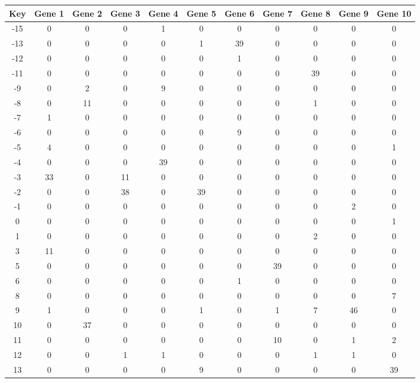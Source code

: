 \begin{tabular}{|c|c|c|c|c|c|c|c|c|c|c|}
\hline
Key & Gene 1 & Gene 2 & Gene 3 & Gene 4 & Gene 5 & Gene 6 & Gene 7 & Gene 8 & Gene 9 & Gene 10 \\
\hline
-15 & 0 & 0 & 0 & 1 & 0 & 0 & 0 & 0 & 0 & 0 \\
-13 & 0 & 0 & 0 & 0 & 1 & 39 & 0 & 0 & 0 & 0 \\
-12 & 0 & 0 & 0 & 0 & 0 & 1 & 0 & 0 & 0 & 0 \\
-11 & 0 & 0 & 0 & 0 & 0 & 0 & 0 & 39 & 0 & 0 \\
-9 & 0 & 2 & 0 & 9 & 0 & 0 & 0 & 0 & 0 & 0 \\
-8 & 0 & 11 & 0 & 0 & 0 & 0 & 0 & 1 & 0 & 0 \\
-7 & 1 & 0 & 0 & 0 & 0 & 0 & 0 & 0 & 0 & 0 \\
-6 & 0 & 0 & 0 & 0 & 0 & 9 & 0 & 0 & 0 & 0 \\
-5 & 4 & 0 & 0 & 0 & 0 & 0 & 0 & 0 & 0 & 1 \\
-4 & 0 & 0 & 0 & 39 & 0 & 0 & 0 & 0 & 0 & 0 \\
-3 & 33 & 0 & 11 & 0 & 0 & 0 & 0 & 0 & 0 & 0 \\
-2 & 0 & 0 & 38 & 0 & 39 & 0 & 0 & 0 & 0 & 0 \\
-1 & 0 & 0 & 0 & 0 & 0 & 0 & 0 & 0 & 2 & 0 \\
0 & 0 & 0 & 0 & 0 & 0 & 0 & 0 & 0 & 0 & 1 \\
1 & 0 & 0 & 0 & 0 & 0 & 0 & 0 & 2 & 0 & 0 \\
3 & 11 & 0 & 0 & 0 & 0 & 0 & 0 & 0 & 0 & 0 \\
5 & 0 & 0 & 0 & 0 & 0 & 0 & 39 & 0 & 0 & 0 \\
6 & 0 & 0 & 0 & 0 & 0 & 1 & 0 & 0 & 0 & 0 \\
8 & 0 & 0 & 0 & 0 & 0 & 0 & 0 & 0 & 0 & 7 \\
9 & 1 & 0 & 0 & 0 & 1 & 0 & 1 & 7 & 46 & 0 \\
10 & 0 & 37 & 0 & 0 & 0 & 0 & 0 & 0 & 0 & 0 \\
11 & 0 & 0 & 0 & 0 & 0 & 0 & 10 & 0 & 1 & 2 \\
12 & 0 & 0 & 1 & 1 & 0 & 0 & 0 & 1 & 1 & 0 \\
13 & 0 & 0 & 0 & 0 & 9 & 0 & 0 & 0 & 0 & 39 \\
\hline
\end{tabular}